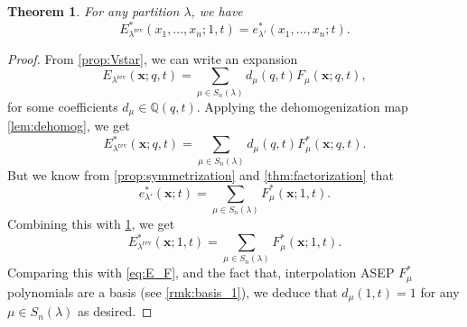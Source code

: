 \documentclass[12pt]{amsart}
\newtheorem{thm}{Theorem}[section]
\theoremstyle{definition}
\newcommand{\bfx}{\boldsymbol{x}}
\DeclareMathOperator{\rev}{rev}
\newcommand{\QQ}{\mathbb Q}
\def\LW#1{(\textcolor{teal}{LW:#1})}
\begin{document}
\begin{appendices}
\begin{thm}\label{thm:E_partition}
    For any partition $\lambda$, we have
    $$E^*_{\lambda^{\rev}}(x_1,\dots,x_n;1,t)=e^*_{\lambda'}(x_1,\dots,x_n;t).$$
\end{thm}
\begin{proof}
From \cref{prop:Vstar}, we can write an expansion
$$E_{\lambda^{\rev}}(\bfx;q,t)=\sum_{\mu\in S_n(\lambda)}d_{\mu}(q,t)F_\mu(\bfx;q,t),$$
for some coefficients $d_\mu\in \QQ(q,t)$.
Applying the dehomogenization map \cref{lem:dehomog}, we get
\begin{equation}\label{eq:E_F}
  E^*_{\lambda^{\rev}}(\bfx;q,t)=\sum_{\mu\in S_n(\lambda)}d_{\mu}(q,t)F^*_\mu(\bfx;q,t).  
\end{equation}
    But we know from \cref{prop:symmetrization} and \cref{thm:factorization} that
    $$e^*_{\lambda'}(\bfx;t)=\sum_{\mu\in S_n(\lambda)}F^*_\mu(\bfx;1,t).$$
    Combining this with  \cref{thm:E_partition},%
        we get
    $$E^*_{\lambda^{\rev}}(\bfx;1,t)=\sum_{\mu\in S_n(\lambda)}F^*_\mu(\bfx;1,t).$$
    Comparing this with \cref{eq:E_F}, and the fact that, interpolation ASEP $F_\mu^*$ polynomials are a basis (see \cref{rmk:basis_1}), we deduce that $d_\mu(1,t)=1$ for any $\mu\in S_n(\lambda)$ as desired.
\end{proof}






\end{appendices}
\end{document}

